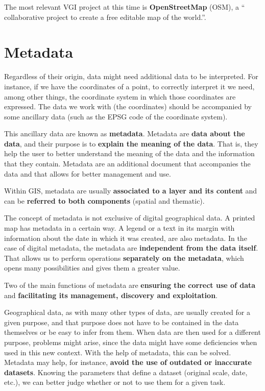 The most relevant VGI project at this time is \textbf{OpenStreetMap} (OSM), a `` collaborative project to create a free editable map of the world.''.


\section{Metadata}

Regardless of their origin, data might need additional data to be interpreted. For instance, if we have the coordinates of a point, to correctly interpret it we need, among other things, the coordinate system in which those coordinates are expressed. The data we work with (the coordinates) should be accompanied by some ancillary data (such as the EPSG code of the coordinate system).

This ancillary data are known as \textbf{metadata}. Metadata are \textbf{data about the data}, and their purpose is to \textbf{explain the meaning of the data}. That is, they help the user to better understand the meaning of the data and the information that they contain. Metadata are an additional document that accompanies the data and that allows for better management and use.

Within GIS, metadata are usually \textbf{associated to a layer and its content} and can be \textbf{referred to both components} (spatial and thematic).

The concept of metadata is not exclusive of digital geographical data. A printed map has metadata in a certain way. A legend or a text in its margin with information about the date in which it was created, are also metadata. In the case of digital metadata, the metadata are \textbf{independent from the data itself}. That allows us to perform operations \textbf{separately on the metadata}, which opens many possibilities and gives them a greater value.

Two of the main functions of metadata are \textbf{ensuring the correct use of data} and \textbf{facilitating its management, discovery and exploitation}.

Geographical data, as with many other types of data, are usually created for a given purpose, and that purpose does not have to be contained in the data themselves or be easy to infer from them. When data are then used for a different purpose, problems might arise, since the data might have some deficiencies when used in this new context. With the help of metadata, this can be solved. Metadata may help, for instance, \textbf{avoid the use of outdated or inaccurate datasets}. Knowing the parameters that define a dataset (original scale, date, etc.), we can better judge whether or not to use them for a given task.

